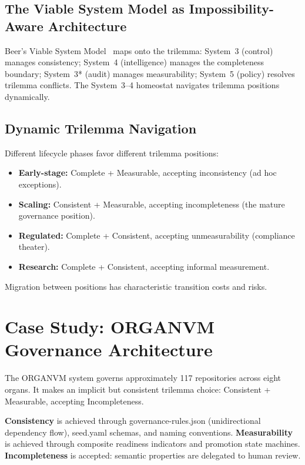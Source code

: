 \documentclass[12pt,a4paper]{article}
\begin{document}
\subsection{The Viable System Model as Impossibility-Aware Architecture}

Beer's Viable System Model~\cite{Beer1972} maps onto the trilemma: System~3
(control) manages consistency; System~4 (intelligence) manages the
completeness boundary; System~3* (audit) manages measurability; System~5
(policy) resolves trilemma conflicts. The System~3--4 homeostat navigates
trilemma positions dynamically.

\subsection{Dynamic Trilemma Navigation}

Different lifecycle phases favor different trilemma positions:
\begin{itemize}
  \item \textbf{Early-stage:} Complete + Measurable, accepting
    inconsistency (ad hoc exceptions).
  \item \textbf{Scaling:} Consistent + Measurable, accepting
    incompleteness (the mature governance position).
  \item \textbf{Regulated:} Complete + Consistent, accepting
    unmeasurability (compliance theater).
  \item \textbf{Research:} Complete + Consistent, accepting informal
    measurement.
\end{itemize}

Migration between positions has characteristic transition costs and risks.

\section{Case Study: ORGANVM Governance Architecture}

The ORGANVM system governs approximately 117 repositories across eight organs.
It makes an implicit but consistent trilemma choice: Consistent + Measurable,
accepting Incompleteness.

\textbf{Consistency} is achieved through governance-rules.json (unidirectional
dependency flow), seed.yaml schemas, and naming conventions. \textbf{Measurability}
is achieved through composite readiness indicators and promotion state
machines. \textbf{Incompleteness} is accepted: semantic properties are
delegated to human review.
\end{document}
